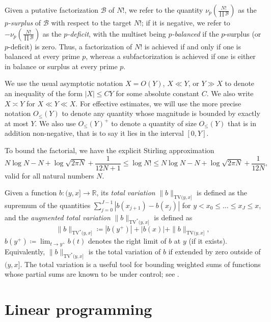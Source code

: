 \documentclass[12pt,a4paper,reqno]{amsart}
\numberwithin{equation}{section}
\theoremstyle{plain}
\theoremstyle{definition}
\newcommand\R{\mathbb{R}}
\newcommand\tuple{{\mathcal B}}
\begin{document}
Given a putative factorization $\tuple$ of $N!$,  
we refer to the quantity $\nu_p\left( \frac{N!}{\prod \tuple} \right)$ as the \emph{$p$-surplus} of $\tuple$ with respect to the target $N!$; if it is negative, we refer to $-\nu_p\left( \frac{N!}{\prod \tuple} \right)$ as the \emph{$p$-deficit}, with the multiset being \emph{$p$-balanced} if the $p$-surplus (or $p$-deficit) is zero.  Thus, a factorization of $N!$ is achieved if and only if one is balanced at every prime $p$, whereas a subfactorization is achieved if one is either in balance or surplus at every prime $p$.

We use the usual asymptotic notation $X = O(Y)$, $X \ll Y$, or $Y \gg X$ to denote an inequality of the form $|X| \leq CY$ for some absolute constant $C$.  We also write $X \asymp Y$ for $X \ll Y \ll X$. For effective estimates, we will use the more precise notation $O_{\leq}(Y)$ to denote any quantity whose magnitude is bounded by exactly at most $Y$. We also use $O_{\leq}(Y)^+$ to denote a quantity of size $O_{\leq}(Y)$ that is in addition non-negative, that is to say it lies in the interval $[0,Y]$.

To bound the factorial, we have the explicit Stirling approximation \cite{robbins}
\begin{equation}\label{stirling}
  N \log N - N + \log \sqrt{2\pi N} + \frac{1}{12N+1} \leq \log N! \leq N \log N - N + \log \sqrt{2\pi N} + \frac{1}{12N},
\end{equation}
valid for all natural numbers $N$. 

Given a function $b \colon (y,x] \to \R$, its \emph{total variation}
$\|b\|_{\mathrm{TV}(y,x]}$ is defined as the supremum of the quantities $\sum_{j=0}^{J-1} |b(x_{j+1})-b(x_j)|$ for $y < x_0 \leq \dots \leq x_J \leq x$, and the \emph{augmented total variation} $\|b\|_{\mathrm{TV}^*(y,x]}$ is defined as
$$
\|b\|_{\mathrm{TV}^*(y,x]}
\coloneqq |b(y^+)| + |b(x)| + \|b\|_{\mathrm{TV}(y,x]},$$
$b(y^+) \coloneqq \lim_{t \to y^+} b(t)$ denotes the right limit of $b$ at $y$ (if it exists).  Equivalently, $\|b\|_{\mathrm{TV}^*(y,x]}$ is the total variation of $b$ if extended by zero outside of $(y,x]$.  The total variation is a useful tool for bounding weighted sums of functions whose partial sums are known to be under control; see .

\section{Linear programming}\label{linprog-sec}
\end{document}
